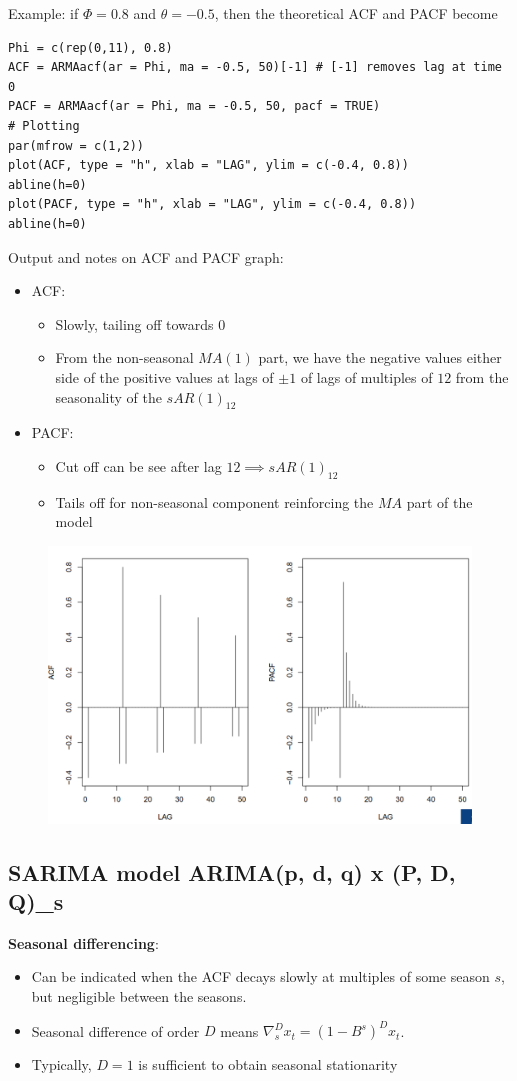 \documentclass[11pt]{article}
\newcommand{\noi}{\noindent}
\begin{document}
\noi Example: if $\Phi = 0.8$ and $\theta = -0.5$, then the theoretical ACF and PACF become
\begin{lstlisting}
Phi = c(rep(0,11), 0.8)
ACF = ARMAacf(ar = Phi, ma = -0.5, 50)[-1] # [-1] removes lag at time 0
PACF = ARMAacf(ar = Phi, ma = -0.5, 50, pacf = TRUE)
# Plotting
par(mfrow = c(1,2))
plot(ACF, type = "h", xlab = "LAG", ylim = c(-0.4, 0.8))
abline(h=0)
plot(PACF, type = "h", xlab = "LAG", ylim = c(-0.4, 0.8))
abline(h=0)
\end{lstlisting}
\noi Output and notes on ACF and PACF graph:
\begin{itemize}
    \item ACF:
        \begin{itemize}
            \item Slowly, tailing off towards 0
            \item From the non-seasonal $MA(1)$ part, we have the negative values either side of the positive values at lags of $\pm1$ of lags of multiples of $12$ from the seasonality of the $sAR(1)_{12}$
        \end{itemize}
    \item PACF:
        \begin{itemize}
            \item Cut off can be see after lag $12 \implies sAR(1)_{12}$
            \item Tails off for non-seasonal component reinforcing the $MA$ part of the model
        \end{itemize}
\end{itemize}
\begin{figure}[H]
    \centering
    \includegraphics[width=0.8\linewidth]{ARMA multiplicative seasonal model - acf and pacf plot.png}
\end{figure}

\subsection{SARIMA model ARIMA(p, d, q) x (P, D, Q)_s}
\noi \textbf{Seasonal differencing}:
\begin{itemize}
    \item Can be indicated when the ACF decays slowly at multiples of some season $s$, but negligible between the seasons.
    \item Seasonal difference of order $D$ means $\nabla_{s}^{D}x_t = (1 - B^s)^Dx_t$.
    \item Typically, $D = 1$ is sufficient to obtain seasonal stationarity
\end{itemize} \phantom{i}
\end{document}
